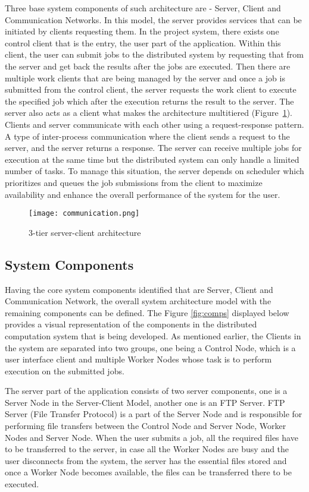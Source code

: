 \documentclass[10pt]{report}
\begin{document}
Three base system components of such architecture are - Server, Client and Communication Networks. In this model, the server provides services that can be initiated by clients requesting them. In the project system, there exists one control client that is the entry, the user part of the application. Within this client, the user can submit jobs to the distributed system by requesting that from the server and get back the results after the jobs are executed. Then there are multiple work clients that are being managed by the server and once a job is submitted from the control client, the server requests the work client to execute the specified job which after the execution returns the result to the server. The server also acts as a client what makes the architecture multitiered (Figure~\ref{fig:3tier}). Clients and server communicate with each other using a request-response pattern. A type of inter-process communication where the client sends a request to the server, and the server returns a response. The server can receive multiple jobs for execution at the same time but the distributed system can only handle a limited number of tasks. To manage this situation, the server depends on scheduler which prioritizes and queues the job submissions from the client to maximize availability and enhance the overall performance of the system for the user.

\begin{figure}[htp]
    \centering
    \texttt{[image: communication.png]}
    \caption{3-tier server-client architecture}
    \label{fig:3tier}
\end{figure}

\subsection{System Components}

Having the core system components identified that are Server, Client and Communication Network, the overall system architecture model with the remaining components can be defined. The Figure \ref{fig:comps} displayed below provides a visual representation of the components in the distributed computation system that is being developed. As mentioned earlier, the Clients in the system are separated into two groups, one being a Control Node, which is a user interface client and multiple Worker Nodes whose task is to perform execution on the submitted jobs.
\newline

The server part of the application consists of two server components, one is a Server Node in the Server-Client Model, another one is an FTP Server. FTP Server (File Transfer Protocol) is a part of the Server Node and is responsible for performing file transfers between the Control Node and Server Node, Worker Nodes and Server Node. When the user submits a job, all the required files have to be transferred to the server, in case all the Worker Nodes are busy and the user disconnects from the system, the server has the essential files stored and once a Worker Node becomes available, the files can be transferred there to be executed.
\newline
\end{document}
